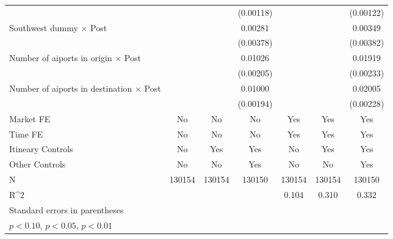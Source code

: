 \begin{table}[htbp]
\begin{tabular}{l*{6}{c}}
                    &                     &                     &   (0.00118)         &                     &                     &   (0.00122)         \\
\addlinespace
Southwest dummy $\times$ Post&                     &                     &     0.00281         &                     &                     &     0.00349         \\
                    &                     &                     &   (0.00378)         &                     &                     &   (0.00382)         \\
\addlinespace
Number of aiports in origin $\times$ Post&                     &                     &     0.01026\sym{***}&                     &                     &     0.01919\sym{***}\\
                    &                     &                     &   (0.00205)         &                     &                     &   (0.00233)         \\
\addlinespace
Number of aiports in destination $\times$ Post&                     &                     &     0.01000\sym{***}&                     &                     &     0.02005\sym{***}\\
                    &                     &                     &   (0.00194)         &                     &                     &   (0.00228)         \\
\midrule
Market FE           &          No         &          No         &          No         &         Yes         &         Yes         &         Yes         \\
Time FE             &          No         &          No         &          No         &         Yes         &         Yes         &         Yes         \\
Itineary Controls   &          No         &         Yes         &         Yes         &          No         &         Yes         &         Yes         \\
Other Controls      &          No         &          No         &         Yes         &          No         &          No         &         Yes         \\
N                   &      130154         &      130154         &      130150         &      130154         &      130154         &      130150         \\
R^2                 &                     &                     &                     &       0.104         &       0.310         &       0.332         \\
\bottomrule
\multicolumn{7}{l}{\footnotesize Standard errors in parentheses}\\
\multicolumn{7}{l}{\footnotesize \sym{*} \(p<0.10\), \sym{**} \(p<0.05\), \sym{***} \(p<0.01\)}\\
\end{tabular}
\end{table}
